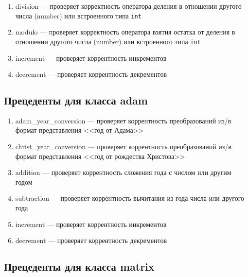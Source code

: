 \documentclass[a4paper,12pt]{article}
\begin{document}
\begin{enumerate}
\item division — проверяет корректность оператора деления в отношении другого числа (number) или встроенного типа \verb!int!

\item modulo — проверяет корректность оператора взятия остатка от деления в отношении другого числа (number) или встроенного типа \verb!int!

\item increment — проверяет коррентность инкрементов

\item decrement — проверяет коррентность декрементов

\end{enumerate}

\subsection{Прецеденты для класса adam}

\begin{enumerate}
	
\item adam\_year\_conversion — проверяет коррентность преобразований из/в формат представления <<год от Адама>>

\item christ\_year\_conversion — проверяет коррентность преобразований из/в формат представления <<год от рождества Христова>>

\item addition — проверяет коррентность сложения года с числом или другим годом

\item subtraction — проверяет коррентность вычитания из года числа или другого года

\item increment — проверяет коррентность инкрементов

\item decrement — проверяет коррентность декрементов
	
\end{enumerate}

\subsection{Прецеденты для класса matrix}
\end{document}
